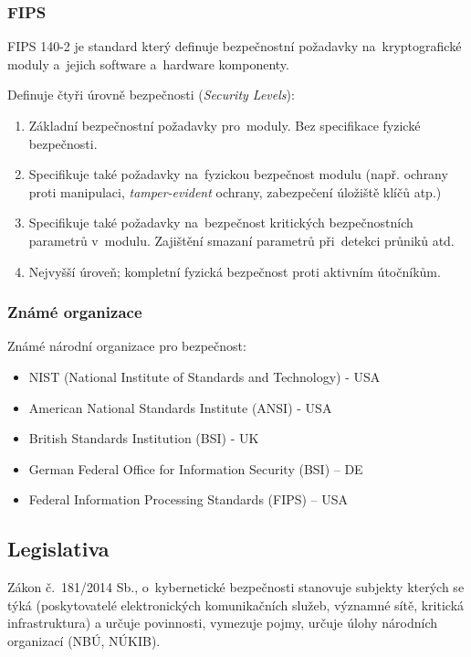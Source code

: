 \subsubsection{FIPS}

FIPS 140-2 je standard který definuje bezpečnostní požadavky na~kryptografické moduly a~jejich software a~hardware komponenty.

Definuje čtyři úrovně bezpečnosti (\emph{Security Levels}):
\begin{enumerate}
\item
    Základní bezpečnostní požadavky pro~moduly.
    Bez specifikace fyzické bezpečnosti.
\item
	Specifikuje také požadavky na~fyzickou bezpečnost modulu (např. ochrany proti manipulaci, \emph{tamper-evident} ochrany, zabezpečení úložiště klíčů atp.)
\item
	Specifikuje také požadavky na~bezpečnost kritických bezpečnostních parametrů v~modulu.
	Zajištění smazaní parametrů při~detekci průniků atd.
\item
	Nejvyšší úroveň; kompletní fyzická bezpečnost proti aktivním útočníkům.
\end{enumerate}


\subsubsection{Známé organizace}
Známé národní organizace pro bezpečnost:
\begin{itemize}
    \item NIST (National Institute of Standards and Technology) - USA
    \item American National Standards Institute (ANSI) - USA
    \item British Standards Institution (BSI) - UK
    \item German Federal Office for Information Security (BSI) – DE
    \item Federal Information Processing Standards (FIPS) – USA
\end{itemize}


\subsection{Legislativa}

Zákon č.~181/2014 Sb., o~kybernetické bezpečnosti stanovuje subjekty kterých se týká (poskytovatelé elektronických komunikačních služeb, významné sítě, kritická infrastruktura) a určuje povinnosti, vymezuje pojmy, určuje úlohy národních organizací (NBÚ, NÚKIB).

